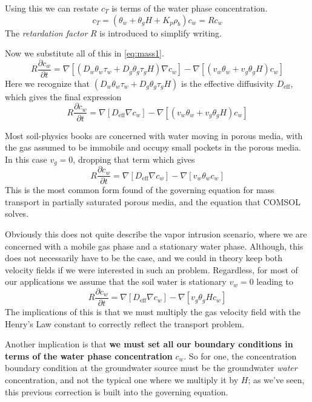 \documentclass{article}
\begin{document}
Using this we can restate $c_T$ is terms of the water phase concentration.
\begin{equation}
  c_T = (\theta_w + \theta_g H + K_p \rho_b) c_w = R c_w
\end{equation}
The \textit{retardation factor} $R$ is introduced to simplify writing.

Now we substitute all of this in \eqref{eq:mass1}.
\begin{equation}\label{eq:mass2}
  R \frac{\partial c_w}{\partial t} = \nabla [(D_w \theta_w \tau_w + D_g \theta_g \tau_g H)\nabla c_w]
    - \nabla [(v_w \theta_w + v_g \theta_g H) c_w]
\end{equation}
Here we recognize that $(D_w \theta_w \tau_w + D_g \theta_g \tau_g H)$ is the effective diffusivity $D_\mathrm{eff}$, which gives the final expression
\begin{equation}\label{eq:mass3}
  R \frac{\partial c_w}{\partial t} = \nabla [D_\mathrm{eff} \nabla c_w]
    - \nabla [(v_w \theta_w + v_g \theta_g H) c_w]
\end{equation}

Most soil-physics books are concerned with water moving in porous media, with the gas assumed to be immobile and occupy small pockets in the porous media.
In this case $v_g = 0$, dropping that term which gives
\begin{equation}\label{eq:mass4}
  R \frac{\partial c_w}{\partial t} = \nabla [D_\mathrm{eff} \nabla c_w]
    - \nabla [v_w \theta_w c_w]
\end{equation}
This is the most common form found of the governing equation for mass transport in partially saturated porous media, and the equation that COMSOL solves.

Obviously this does not quite describe the vapor intrusion scenario, where we are concerned with a mobile gas phase and a stationary water phase.
Although, this does not necessarily have to be the case, and we could in theory keep both velocity fields if we were interested in such an problem.
Regardless, for most of our applications we assume that the soil water is stationary $v_w = 0$ leading to
\begin{equation}\label{eq:mass5}
  R \frac{\partial c_w}{\partial t} = \nabla [D_\mathrm{eff} \nabla c_w]
    - \nabla [v_g \theta_g H c_w]
\end{equation}
The implications of this is that we must multiply the gas velocity field with the Henry's Law constant to correctly reflect the transport problem.

Another implication is that \textbf{we must set all our boundary conditions in terms of the water phase concentration} $c_w$.
So for one, the concentration boundary condition at the groundwater source must be the groundwater \textit{water} concentration, and not the typical one where we multiply it by $H$; as we've seen, this previous correction is built into the governing equation.
\end{document}
